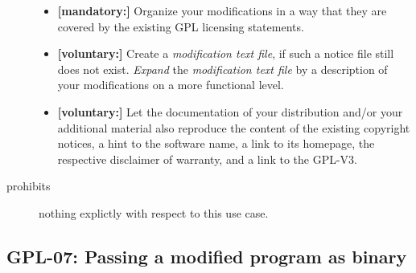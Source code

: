 \begin{description}
\begin{itemize}
  \item \textbf{[mandatory:]} Organize your modifications in a way that they are
  covered by the existing GPL licensing statements.
  
  \item \textbf{[voluntary:]} Create a \emph{modification text file}, if such a
  notice file still does not exist. \emph{Expand} the \emph{modification text
  file} by a description of your modifications on a more functional level.
    
  \item \textbf{[voluntary:]} Let the documentation of your distribution and/or
  your additional material also reproduce the content of the existing
  copyright notices, a hint to the software name, a link to its homepage,
  the respective disclaimer of warranty, and a link to the GPL-V3.
  
 \end{itemize}
 
\item[prohibits] nothing explictly with respect to this use case.

\end{description}

\subsection{GPL-07: Passing a modified program as binary}
\label{OSUC-04B-GPL}

